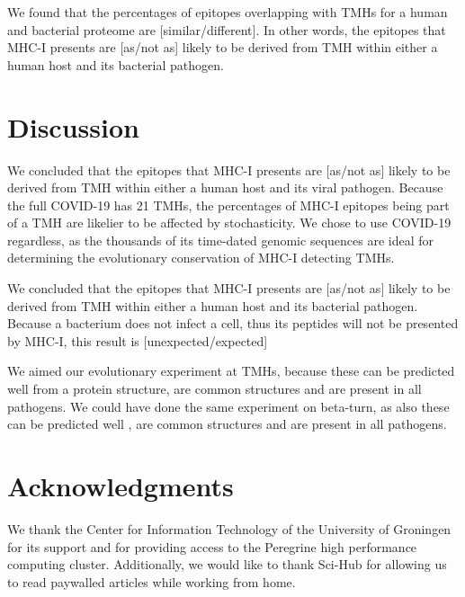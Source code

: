 We found that the percentages of epitopes overlapping 
with TMHs for a human and bacterial proteome are 
[similar/different]. In other words, the
epitopes that MHC-I presents are [as/not as] likely 
to be derived from TMH within either a human host and its bacterial pathogen.

\section{Discussion}

We concluded that the
epitopes that MHC-I presents are [as/not as] likely 
to be derived from TMH within either a human host and its viral pathogen.
Because the full COVID-19 has 21 TMHs, the percentages
of MHC-I epitopes being part of a TMH are likelier to be affected by
stochasticity. We chose to use COVID-19 regardless, as the thousands
of its time-dated genomic sequences are ideal for determining the 
evolutionary conservation of MHC-I detecting TMHs. 

We concluded that the
epitopes that MHC-I presents are [as/not as] likely 
to be derived from TMH within either a human host and its bacterial pathogen.
Because a bacterium does not infect a cell, thus its peptides
will not be presented by MHC-I, this result is [unexpected/expected]

We aimed our evolutionary experiment at TMHs, because these can
be predicted well from a protein structure,
are common structures and are present in all pathogens. 
We could have done the same experiment on beta-turn,
as also these can be predicted well \cite{petersen2010netturnp},
are common structures and are present in all pathogens.


\section{Acknowledgments}

We thank the Center for Information Technology of the University 
of Groningen for its support and for providing access to the Peregrine 
high performance computing cluster. 
Additionally, we would like to thank Sci-Hub \cite{himmelstein2018sci}
for allowing us to read paywalled articles while working from home.


